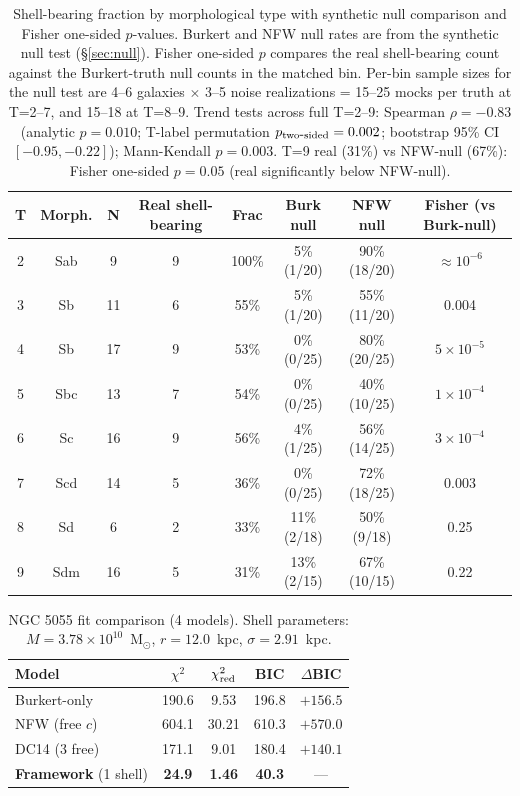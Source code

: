 \begin{table}
\centering
\caption{Shell-bearing fraction by morphological type with synthetic null comparison and Fisher one-sided $p$-values. Burkert and NFW null rates are from the synthetic null test (\S\ref{sec:null}). Fisher one-sided $p$ compares the real shell-bearing count against the Burkert-truth null counts in the matched bin. Per-bin sample sizes for the null test are 4--6 galaxies $\times$ 3--5 noise realizations = 15--25 mocks per truth at T=2--7, and 15--18 at T=8--9. Trend tests across full T=2--9: Spearman $\rho = -0.83$ (analytic $p = 0.010$; T-label permutation $p_{\rm two\mbox{-}sided} = 0.002$; bootstrap 95\% CI $[-0.95, -0.22]$); Mann-Kendall $p = 0.003$. T=9 real (31\%) vs NFW-null (67\%): Fisher one-sided $p = 0.05$ (real significantly below NFW-null).}
\label{tab:morphology}
\begin{tabular}{cccccccc}
\toprule
T & Morph. & N & Real shell-bearing & Frac & Burk null & NFW null & Fisher (vs Burk-null) \\
\midrule
2 & Sab & 9 & 9 & 100\% & 5\% (1/20) & 90\% (18/20) & $\approx 10^{-6}$ \\
3 & Sb  & 11 & 6 & 55\% & 5\% (1/20) & 55\% (11/20) & 0.004 \\
4 & Sb  & 17 & 9 & 53\% & 0\% (0/25) & 80\% (20/25) & $5 \times 10^{-5}$ \\
5 & Sbc & 13 & 7 & 54\% & 0\% (0/25) & 40\% (10/25) & $1 \times 10^{-4}$ \\
6 & Sc  & 16 & 9 & 56\% & 4\% (1/25) & 56\% (14/25) & $3 \times 10^{-4}$ \\
7 & Scd & 14 & 5 & 36\% & 0\% (0/25) & 72\% (18/25) & 0.003 \\
8 & Sd  & 6  & 2 & 33\% & 11\% (2/18) & 50\% (9/18) & 0.25 \\
9 & Sdm & 16 & 5 & 31\% & 13\% (2/15) & 67\% (10/15) & 0.22 \\
\bottomrule
\end{tabular}
\end{table}

\begin{table}
\centering
\caption{NGC 5055 fit comparison (4 models). Shell parameters: $M = 3.78 \times 10^{10}$~M$_\odot$, $r = 12.0$~kpc, $\sigma = 2.91$~kpc.}
\label{tab:ngc5055}
\begin{tabular}{lcccc}
\toprule
Model & $\chi^2$ & $\chi^2_{\rm red}$ & BIC & $\Delta$BIC \\
\midrule
Burkert-only & 190.6 & 9.53 & 196.8 & $+156.5$ \\
NFW (free $c$) & 604.1 & 30.21 & 610.3 & $+570.0$ \\
DC14 (3 free) & 171.1 & 9.01 & 180.4 & $+140.1$ \\
\textbf{Framework} (1 shell) & \textbf{24.9} & \textbf{1.46} & \textbf{40.3} & --- \\
\bottomrule
\end{tabular}
\end{table}

